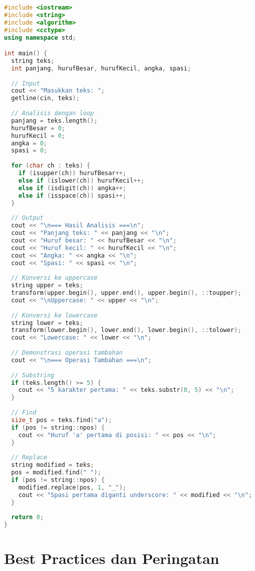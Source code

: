 \documentclass[../main.tex]{subfiles}
\begin{document}
\begin{lstlisting}[language=C++, caption={Program pengolahan string di C++}]
#include <iostream>
#include <string>
#include <algorithm>
#include <cctype>
using namespace std;

int main() {
  string teks;
  int panjang, hurufBesar, hurufKecil, angka, spasi;
  
  // Input
  cout << "Masukkan teks: ";
  getline(cin, teks);
  
  // Analisis dengan loop
  panjang = teks.length();
  hurufBesar = 0;
  hurufKecil = 0;
  angka = 0;
  spasi = 0;
  
  for (char ch : teks) {
    if (isupper(ch)) hurufBesar++;
    else if (islower(ch)) hurufKecil++;
    else if (isdigit(ch)) angka++;
    else if (isspace(ch)) spasi++;
  }
  
  // Output
  cout << "\n=== Hasil Analisis ===\n";
  cout << "Panjang teks: " << panjang << "\n";
  cout << "Huruf besar: " << hurufBesar << "\n";
  cout << "Huruf kecil: " << hurufKecil << "\n";
  cout << "Angka: " << angka << "\n";
  cout << "Spasi: " << spasi << "\n";
  
  // Konversi ke uppercase
  string upper = teks;
  transform(upper.begin(), upper.end(), upper.begin(), ::toupper);
  cout << "\nUppercase: " << upper << "\n";
  
  // Konversi ke lowercase
  string lower = teks;
  transform(lower.begin(), lower.end(), lower.begin(), ::tolower);
  cout << "Lowercase: " << lower << "\n";
  
  // Demonstrasi operasi tambahan
  cout << "\n=== Operasi Tambahan ===\n";
  
  // Substring
  if (teks.length() >= 5) {
    cout << "5 karakter pertama: " << teks.substr(0, 5) << "\n";
  }
  
  // Find
  size_t pos = teks.find("a");
  if (pos != string::npos) {
    cout << "Huruf 'a' pertama di posisi: " << pos << "\n";
  }
  
  // Replace
  string modified = teks;
  pos = modified.find(" ");
  if (pos != string::npos) {
    modified.replace(pos, 1, "_");
    cout << "Spasi pertama diganti underscore: " << modified << "\n";
  }
  
  return 0;
}
\end{lstlisting}

\section{Best Practices dan Peringatan}
\end{document}
